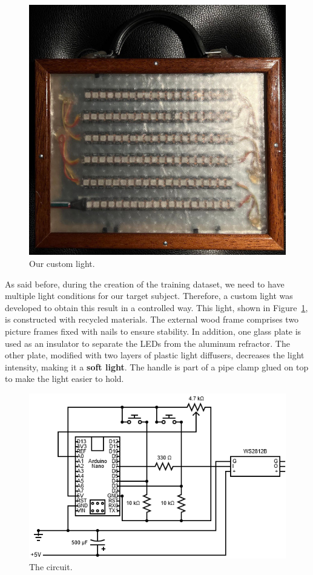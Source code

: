 \documentclass[preprint]{elsarticle}
\begin{document}
\begin{figure}[t]
	\centering
	\includegraphics[scale=0.25, keepaspectratio]{img/project_img/light.jpeg}
	\caption{Our custom light.}
	\label{fig:light}
\end{figure}

As said before, during the creation of the training dataset, we need to have multiple 
light conditions for our target subject. 
Therefore, a custom light was developed to obtain this result in a controlled way.
This light, shown in Figure~\ref{fig:light}, is constructed with recycled materials.
The external wood frame comprises two picture frames fixed with nails to ensure stability. 
In addition, one glass plate is used as an insulator to separate the LEDs from the aluminum refractor.
The other plate, modified with two layers of plastic light diffusers, 
decreases the light intensity, making it a \textbf{soft light}.
The handle is part of a pipe clamp glued on top to make the light easier to hold.

\begin{figure}[H]
	\centering
	\includegraphics[scale=0.55, keepaspectratio]{img/project_img/circuit-light.png}
	\caption{The circuit.}
	\label{fig:light-circuit}
\end{figure}
\end{document}

